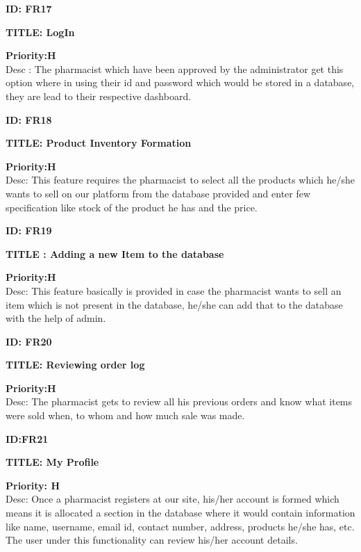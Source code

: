\documentclass{scrreprt}
\begin{document}
\item \textbf{ID: FR17}
\item \textbf{TITLE: LogIn}
\item \textbf{Priority:H}\\
Desc : The pharmacist which have been approved by the administrator get this option where in using their id and password which would be stored in a database, they are lead to their respective dashboard.\\

\item \textbf{ID: FR18}
\item \textbf{TITLE: Product Inventory Formation}
\item \textbf{Priority:H}\\
Desc: This feature requires the pharmacist to select all the products which he/she wants to sell on our platform from the database provided and enter few specification like stock of the product he has and the price.\\

\item \textbf{ID: FR19}
\item \textbf{TITLE	: Adding a new Item to the database}
\item \textbf{Priority:H}\\
Desc: This feature basically is provided in case the pharmacist wants to sell an item which is not present in the database, he/she can add that to the database with the help of admin.\\

\item \textbf{ID: FR20}
\item \textbf{TITLE: Reviewing order log}
\item \textbf{Priority:H}\\
Desc: The pharmacist gets to review all his previous orders and know what items were sold when, to whom and how much sale was made.\\

\item \textbf{ID:FR21}
\item \textbf{TITLE: My Profile}
\item \textbf{Priority: H}\\
Desc: Once a pharmacist registers at our site, his/her account is formed which means it is allocated a section in the database where it would contain information like name, username, email id, contact number, address, products he/she has, etc. The user under this functionality can review his/her account details.\\
\end{document}

